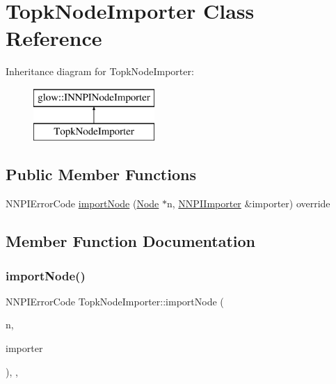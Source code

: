 \hypertarget{class_topk_node_importer}{}\section{Topk\+Node\+Importer Class Reference}
\label{class_topk_node_importer}
Inheritance diagram for Topk\+Node\+Importer\+:\begin{figure}[H]
\begin{center}
\leavevmode
\includegraphics[height=2.000000cm]{class_topk_node_importer}
\end{center}
\end{figure}
\subsection*{Public Member Functions}
\begin{DoxyCompactItemize}
\item 
N\+N\+P\+I\+Error\+Code \hyperlink{class_topk_node_importer_aa905e03721d552b9798f817e547f0aea}{import\+Node} (\hyperlink{classglow_1_1_node}{Node} $\ast$n, \hyperlink{classglow_1_1_n_n_p_i_importer}{N\+N\+P\+I\+Importer} \&importer) override
\end{DoxyCompactItemize}


\subsection{Member Function Documentation}
\mbox{\label{class_topk_node_importer_aa905e03721d552b9798f817e547f0aea}} 
\subsubsection{\texorpdfstring{import\+Node()}{importNode()}}
{\footnotesize\ttfamily N\+N\+P\+I\+Error\+Code Topk\+Node\+Importer\+::import\+Node (\begin{DoxyParamCaption}\item[{\hyperlink{classglow_1_1_node}{Node} $\ast$}]{n,  }\item[{\hyperlink{classglow_1_1_n_n_p_i_importer}{N\+N\+P\+I\+Importer} \&}]{importer }\end{DoxyParamCaption})\hspace{0.3cm}{\ttfamily [inline]}, {\ttfamily [override]}, {\ttfamily [virtual]}}

